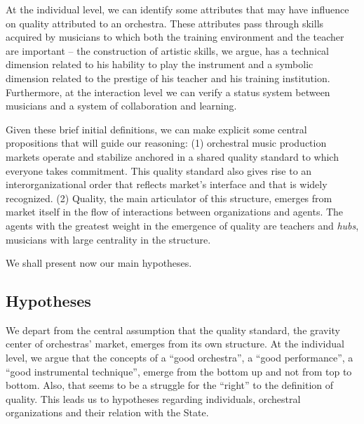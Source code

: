\documentclass[a4paper, 12pt, openright, oneside, german, french, brazil, english, article]{abntex2}
\begin{document}
	At the individual level, we can identify some attributes that may have influence on quality attributed to an orchestra. These attributes pass through skills acquired by musicians to which both the training environment and the teacher are important -- the construction of artistic skills, we argue, has a technical dimension related to his hability to play the instrument and a symbolic dimension related to the prestige of his teacher and his training institution. Furthermore, at the interaction level we can verify a status system between musicians and a system of collaboration and learning.
	
	
	Given these brief initial definitions, we can make explicit some central propositions that will guide our reasoning: (1) orchestral music production markets operate and stabilize anchored in a shared quality standard to which everyone takes commitment. This quality standard also gives rise to an interorganizational order that reflects market's interface and that is widely recognized. (2) Quality, the main articulator of this structure, emerges from market itself in the flow of interactions between organizations and agents. The agents with the greatest weight in the emergence of quality are teachers and \textit{hubs}, musicians with large centrality in the structure.
	
	
	We shall present now our main hypotheses.
	
	
	\subsection{Hypotheses}
	\newtheorem{hip}{Hypothesis}
	
	We depart from the central assumption that the quality standard, the gravity center of orchestras' market, emerges from its own structure. At the individual level, we argue that the concepts of a ``good orchestra'', a ``good performance'', a ``good instrumental technique'', emerge from the bottom up and not from top to bottom. Also, that seems to be a struggle for the ``right'' to the definition of quality. This leads us to hypotheses regarding individuals, orchestral organizations and their relation with the State.
	
\end{document}
